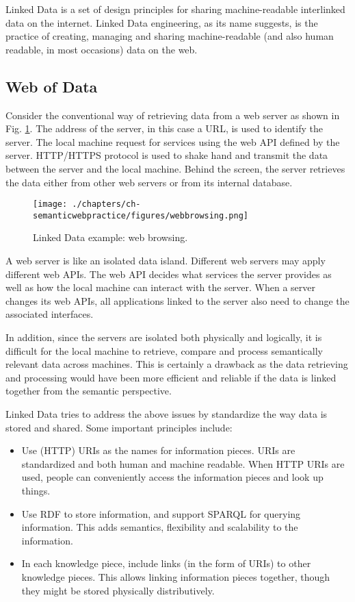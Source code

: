 Linked Data is a set of design principles for sharing machine-readable interlinked data on the internet. Linked Data engineering, as its name suggests, is the practice of creating, managing and sharing machine-readable (and also human readable, in most occasions) data on the web.

\subsection{Web of Data}

Consider the conventional way of retrieving data from a web server as shown in Fig. \ref{fig:webbrowsing}. The address of the server, in this case a URL, is used to identify the server. The local machine request for services using the web API defined by the server. HTTP/HTTPS protocol is used to shake hand and transmit the data between the server and the local machine. Behind the screen, the server retrieves the data either from other web servers or from its internal database.
\begin{figure}[htbp]
	\centering
	\texttt{[image: ./chapters/ch-semanticwebpractice/figures/webbrowsing.png]}
	\caption{Linked Data example: web browsing.}
	\label{fig:webbrowsing}
\end{figure}

A web server is like an isolated data island. Different web servers may apply different web APIs. The web API decides what services the server provides as well as how the local machine can interact with the server. When a server changes its web APIs, all applications linked to the server also need to change the associated interfaces. 

In addition, since the servers are isolated both physically and logically, it is difficult for the local machine to retrieve, compare and process semantically relevant data across machines. This is certainly a drawback as the data retrieving and processing would have been more efficient and reliable if the data is linked together from the semantic perspective.

Linked Data tries to address the above issues by standardize the way data is stored and shared. Some important principles include:
\begin{itemize}
	\item Use (HTTP) URIs as the names for information pieces. URIs are standardized and both human and machine readable. When HTTP URIs are used, people can conveniently access the information pieces and look up things.
	\item Use RDF to store information, and support SPARQL for querying information. This adds semantics, flexibility and scalability to the information.
	\item In each knowledge piece, include links (in the form of URIs) to other knowledge pieces. This allows linking information pieces together, though they might be stored physically distributively.
\end{itemize} 

